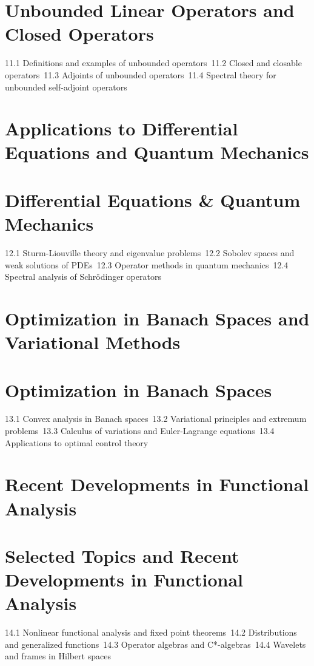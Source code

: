 \section{Unbounded Linear Operators and Closed Operators}
11.1 Definitions and examples of unbounded operators\
11.2 Closed and closable operators\
11.3 Adjoints of unbounded operators\
11.4 Spectral theory for unbounded self-adjoint operators\
\section{Applications to Differential Equations and Quantum Mechanics}
\section{Differential Equations \& Quantum Mechanics}
12.1 Sturm-Liouville theory and eigenvalue problems\
12.2 Sobolev spaces and weak solutions of PDEs\
12.3 Operator methods in quantum mechanics\
12.4 Spectral analysis of Schrödinger operators\
\section{Optimization in Banach Spaces and Variational Methods}
\section{Optimization in Banach Spaces}
13.1 Convex analysis in Banach spaces\
13.2 Variational principles and extremum problems\
13.3 Calculus of variations and Euler-Lagrange equations\
13.4 Applications to optimal control theory\
\section{Recent Developments in Functional Analysis}
\section{Selected Topics and Recent Developments in Functional Analysis}
14.1 Nonlinear functional analysis and fixed point theorems\
14.2 Distributions and generalized functions\
14.3 Operator algebras and C*-algebras\
14.4 Wavelets and frames in Hilbert spaces\
